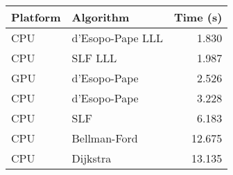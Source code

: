 \begin{tabular}{llr}
  \hline
  Platform & Algorithm & Time (s) \\
  \hline
  CPU & d'Esopo-Pape LLL & 1.830 \\
  CPU & SLF LLL & 1.987 \\
  GPU & d'Esopo-Pape & 2.526 \\
  CPU & d'Esopo-Pape & 3.228 \\
  CPU & SLF & 6.183 \\
  CPU & Bellman-Ford & 12.675 \\
  CPU & Dijkstra & 13.135 \\
  \hline
\end{tabular}

